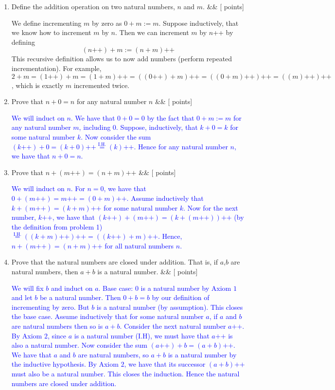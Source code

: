 \documentclass[12pt]{article}
\newcommand{\points}[1]{\hfill {[#1 points]}}
\newcommand{\problem}[2][]{%
  \item {#2}%
  \ifx&#1&%
  \else%
    \points{#1}%
  \fi
  \par\vspace{0.5em}
}
\begin{document}
\begin{enumerate}[leftmargin=*, label=\textbf{\arabic*.}]

    \problem{Define the addition operation on two natural numbers, $n$ and $m$.}
	We define incrementing $m$ by zero as $0 + m := m$. Suppose inductively, that we know how to increment $m$ by $n$. Then we can increment $m$ by $n$++ by defining $$(n\text{++}) + m := (n + m)\text{++}$$ This recursive definition allows us to now add numbers (perform repeated incrementation). For example, $2+m = (1\text{++})+m = (1+m)\text{++} = ((0\text{++})+m)\text{++} = ((0+m)\text{++})\text{++} = ((m)\text{++})\text{++}$, which is exactly $m$ incremented twice.
	
    \problem{Prove that $n+0 = n$ for any natural number $n$}
        	\textcolor{blue}{ We will induct on $n$. We have that $0+0 = 0$ by the fact that $0 + m := m$ for any natural number $m$, including $0$. Suppose, inductively, that $k+0=k$ for some natural number $k$. Now consider the sum $(k\text{++}) + 0 = (k+0)\text{++} \overset{\text{I.H.}}{=} (k)\text{++}$. Hence for any natural number $n$, we have that $n+0 = n$.
}

    \problem{Prove that $n + (m\text{++}) = (n + m)\text{++}$}
        	\textcolor{blue}{We will induct on $n$. For $n = 0$, we have that $0 + (m\text{++}) = m\text{++} = (0 + m)\text{++}$. Assume inductively that $k + (m\text{++}) = (k + m)\text{++}$ for some natural number $k$. Now for the next number, $k\text{++}$, we have that $(k\text{++}) + (m\text{++}) = (k + (m\text{++}))\text{++}$ (by the definition from problem 1) $\overset{\text{I.H.}}{=} ((k+m)\text{++})\text{++} = ((k\text{++}) + m)\text{++}$. Hence, $n + (m\text{++}) = (n + m)\text{++}$ for all natural numbers $n$.}
	
	
	 \problem{Prove that the natural numbers are closed under addition. That is, if $a$,$b$ are natural numbers, then $a+b$ is a natural number.}
    	\textcolor{blue}{We will fix $b$ and induct on $a$. Base case: $0$ is a natural number by Axiom $1$ and let $b$ be a natural number. Then $0+b = b$ by our definition of incrementing by zero. But $b$ is a natural number (by assumption). This closes the base case. Assume inductively that for some natural number $a$, if $a$ and $b$ are natural numbers then so is $a+b$. Consider the next natural number $a\text{++}$. By Axiom $2$, since $a$ is a natural number (I.H), we must have that $a\text{++}$ is also a natural number. Now consider the sum $(a\text{++}) + b = (a+b)\text{++}$. We have that $a$ and $b$ are natural numbers, so $a+b$ is a natural number by the inductive hypothesis. By Axiom $2$, we have that its successor $(a+b)\text{++}$ must also be a natural number. This closes the induction. Hence the natural numbers are closed under addition.}
	

\end{enumerate}
\end{document}
